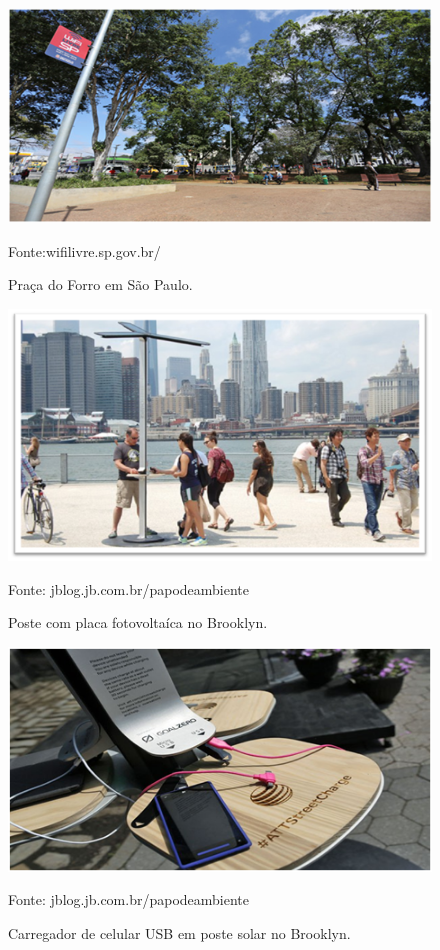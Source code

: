 \begin{figure}[H]
	 \centering
	\label{Praça do forró em São Paulo}
	 \includegraphics[keepaspectratio=true,scale=0.8]{interacao/25.png}
	 \caption{Praça do Forro em São Paulo.}
	 \small{Fonte:wifilivre.sp.gov.br/}
\end{figure}

\begin{figure}[H]
	 \centering
	\label{Poste com placa fotovoltaíca}
	 \includegraphics[keepaspectratio=true,scale=0.8]{interacao/26.png}
	 \caption{Poste com placa fotovoltaíca no Brooklyn.}
	 \small{Fonte: jblog.jb.com.br/papodeambiente}
\end{figure}

\begin{figure}[H]
	 \centering
	\label{Carregador de celular USB em poste solar no Brooklyn}
	 \includegraphics[keepaspectratio=true,scale=0.8]{interacao/27.png}
	 \caption{Carregador de celular USB em poste solar no Brooklyn.}
	 \small{Fonte: jblog.jb.com.br/papodeambiente}
\end{figure}	

